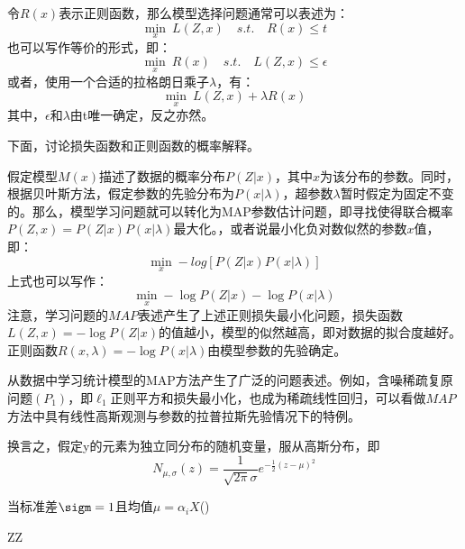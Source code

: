 令$ R(x) $表示正则函数，那么模型选择问题通常可以表述为：
\begin{equation}\label{key}
\min_{x}\:  L(Z,x)\quad s.t.\quad R(x)\leq t
\end{equation}
也可以写作等价的形式，即：
\begin{equation}\label{key}
\min_{x}\: R(x) \quad  s.t.\quad L(Z,x)\leq \epsilon
\end{equation}
或者，使用一个合适的拉格朗日乘子$\lambda $，有：
\begin{equation}\label{key}
\min_{x}\:  L(Z,x)+\lambda R(x)
\end{equation}
其中，$ \epsilon $和$ \lambda $由t唯一确定，反之亦然。

{\heiti 下面，讨论损失函数和正则函数的概率解释。}

假定模型$ M(x) $描述了数据的概率分布$ P(Z|x) $，其中$ x $为该分布的参数。同时，根据贝叶斯方法，假定参数的先验分布为$ P(x|\lambda) $，超参数$ \lambda $暂时假定为固定不变的。那么，模型学习问题就可以转化为MAP参数估计问题，即寻找使得联合概率$ P(Z,x)=P(Z|x)P(x|\lambda) $最大化。，或者说最小化负对数似然的参数$ x $值，即：
\begin{equation}\label{key}
\min_{x} -log\left [P(Z|x)P(x|\lambda)\right ]
\end{equation}
上式也可以写作：
\begin{equation}\label{key}
\min_{x} -\log P(Z|x) - \log P(x|\lambda)
\end{equation}
注意，学习问题的$ MAP $表述产生了上述正则损失最小化问题，损失函数$ L(Z,x)=-\log P(Z|x) $的值越小，模型的似然越高，即对数据的拟合度越好。正则函数$ R(x,\lambda)=-\log P(x|\lambda) $由模型参数的先验确定。



从数据中学习统计模型的MAP方法产生了广泛的问题表述。例如，含噪稀疏复原问题$ (P_1) $，即$ \ell_1$正则平方和损失最小化，也成为稀疏线性回归，可以看做$ MAP $方法中具有线性高斯观测与参数的拉普拉斯先验情况下的特例。

换言之，假定y的元素为独立同分布的随机变量，服从高斯分布，即
\begin{equation}\label{key}
N_{\mu,\sigma}(z)=\dfrac{1}{\sqrt{2\pi }\sigma}e^{-\frac{1}{2}(z-\mu)^2}
\end{equation}

当标准差$\sigm =1 $且均值$ \mu =\alpha_i X$($  $)








ZZ
















